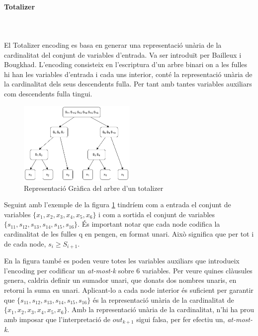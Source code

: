 \documentclass[11pt,a4paper,twoside]{report}
\begin{document}
  \paragraph*{Totalizer} ~\\~\\
  El Totalizer encoding es basa en generar una representació unària de la cardinalitat del conjunt de variables d'entrada. 
  Va ser introduït per Bailleux i Bougkhad\cite{Bailleux2003EfficientCE}. L'encoding consisteix en l'escriptura d'un arbre binari on a les fulles hi han les variables d'entrada i cada uns interior, 
  conté la representació unària de la cardinalitat dels seus descendents fulla. Per tant amb tantes variables auxiliars com descendents fulla tingui.

  \begin{figure}[ht!]
    \centering
    \includegraphics[width=0.5\textwidth]{Diagrames/totalizer.png}
    \caption{Representació Gràfica del arbre d'un totalizer}
    \label{fig:totalizer}
  \end{figure}

  Seguint amb l'exemple de la figura \ref{fig:totalizer} tindríem com a entrada el conjunt de variables $\{x_1, x_2, x_3, x_4, x_5, x_6\}$ i com a sortida el conjunt de variables $\{s_11, s_12, s_13, s_14, s_15, s_16\}$. És important notar que cada node codifica la cardinalitat de les fulles q en pengen, en format unari. Això significa que per tot i de cada node, $s_i \geq S_{i+1}$.

  En la figura també es poden veure totes les variables auxiliars que introdueix l'encoding per codificar un \textit{at-most-k} sobre 6 variables. Per veure quines clàusules genera, caldria definir un sumador unari, que donats dos nombres unaris, en retorni la suma en unari. 
  Aplicant-lo a cada node interior és suficient per garantir que $\{s_11, s_12, s_13, s_14, s_15, s_16\}$ és la representació unària de la cardinalitat de $\{x_1, x_2, x_3, x_4, x_5, x_6\}$. 
  Amb la representació unària de la cardinalitat, n'hi ha prou amb imposar que l'interpretació de $out_{k+1}$ sigui falsa, per fer efectiu un, \textit{at-most-k}. 
\end{document}
